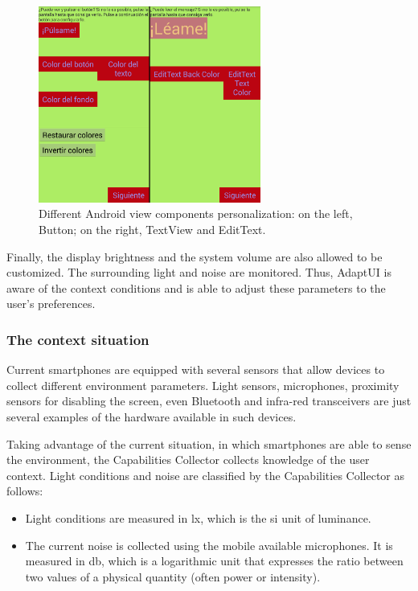 \begin{figure}
\centering
\includegraphics[width=0.65\textwidth]{views_activity.png}
\caption{Different Android view components
personalization: on the left, Button; on the right, TextView and EditText.}
\label{fig:views_activity}
\end{figure}

Finally, the display brightness and the system volume are also allowed to be
customized. The surrounding light and noise are monitored. Thus, AdaptUI is
aware of the context conditions and is able to adjust these parameters to 
the user's preferences.

 
\subsubsection{The context situation}
\label{sec:context_situation}
Current smartphones are equipped with several sensors that allow devices to
collect different environment parameters. Light sensors, microphones, proximity 
sensors for disabling the screen, even Bluetooth and infra-red transceivers are 
just several examples of the hardware available in such devices.

Taking advantage of the current situation, in which smartphones are able to sense
the environment, the Capabilities Collector collects knowledge of the user context.
Light conditions and noise are classified by the Capabilities Collector as follows:

\begin{itemize}
 \item Light conditions are measured in \ac{lx}, which is the \ac{si} unit of 
 luminance.
 
 \item The current noise is collected using the mobile available microphones. It
 is measured in \ac{db}, which is a logarithmic unit that expresses the ratio
 between two values of a physical quantity (often power or intensity).
\end{itemize}

